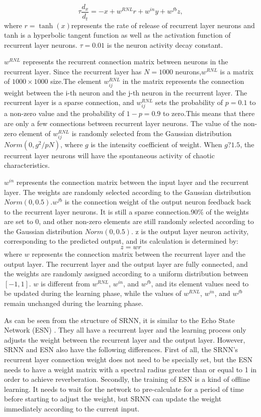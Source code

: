 \documentclass[runningheads]{llncs}
\begin{document}
\begin{equation}
\tau \frac{d_x}{d_t}=-x+w^{RNL}r+w^{in}y+w^{fb}z,
\end{equation}
where $r = \tanh(x)$represents the rate of release 
of recurrent layer neurons and tanh is a hyperbolic 
tangent function as well as the activation function of 
recurrent layer neurons. $\tau=0.01$ is the neuron activity
 decay constant.

$w^{RNL}$ represents the recurrent connection matrix between 
neurons in the recurrent layer.
Since the recurrent layer has $N=1000$ neurons,$w^{RNL}$ is a 
matrix of $1000\times1000$ size.The element $w_{ij}^{RNL}$
in the matrix represents the connection weight between 
the i-th neuron and the j-th neuron in the recurrent layer.
The recurrent layer is a sparse connection, and $w_{ij}^{RNL}$
sets the probability of $p=0.1$ to a non-zero value and the 
probability of $1-p=0.9$ to zero.This means that there are only a 
few connections between recurrent layer neurons.
The value of the non-zero element of $w_{ij}^{RNL}$ 
is randomly selected from the Gaussian distribution $Norm(0,g^{2}/pN)$,
where $g$ is the intensity coefficient of weight.
When \underline{$g?1.5$}, the recurrent layer neurons will have the 
spontaneous activity of chaotic characteristics\cite{RN17}.

$w^{in}$ represents the connection matrix between the 
input layer and the recurrent layer.
The weights are randomly selected according to the 
Gaussian distribution $Norm(0, 0.5)$.$w^{fb}$ is the connection 
weight of the output neuron feedback back to the recurrent layer neurons. 
It is still a sparse connection.90$\%$ of the weights are set to 0, 
and other non-zero elements are still randomly selected according 
to the Gaussian distribution $Norm(0,0.5)$.
z is the output layer neuron activity, corresponding to 
the predicted output, and its calculation is determined by:
\begin{equation}
z=wr
\end{equation}
where $w$ represents the connection matrix between the recurrent layer 
and the output layer. The recurrent layer and the output layer are 
fully connected, and the weights are randomly assigned according 
to a uniform distribution between $\left[-1,1\right]$. 
$w$ is different from $w^{RNL}$, $w^{in}$, and $w^{fb}$, and
its element values need to be updated during the learning phase,
 while the values of $w^{RNL}$, $w^{in}$, and $w^{fb}$ remain unchanged during 
 the learning phase.

As can be seen from the structure of SRNN, it is similar to the Echo 
State Network (ESN) \cite{RN22}.
They all have a recurrent layer and the learning process only adjusts 
the weight between the recurrent layer and the output layer. However, 
SRNN and ESN also have the following differences. First of all, 
the SRNN's recurrent layer connection weight does not need to be 
specially set, but the ESN needs to have a weight matrix with a 
spectral radius greater than or equal to 1 in order to achieve reverberation.
Secondly, the training of ESN is a kind of offline learning. It needs to wait 
for the network to pre-calculate for a period of time before starting to
adjust the weight, but SRNN can update the weight immediately according 
to the current input.
\end{document}
